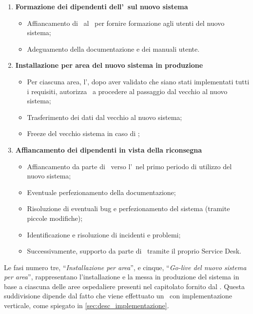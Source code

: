 \begin{enumerate}
		\item \textbf{Formazione dei dipendenti dell'\istituto~sul nuovo sistema}
			\begin{itemize}[noitemsep]
				\renewcommand\labelitemi{--}
				\item Affiancamento di \azienda~al \proponente~per fornire formazione agli utenti del nuovo sistema;
				\item Adeguamento della documentazione e dei manuali utente.
			\end{itemize}
		
		\item \textbf{Installazione per area del nuovo sistema in produzione}
			\begin{itemize}[noitemsep]
				\renewcommand\labelitemi{--}
				\item Per ciascuna area, l'\istituto, dopo aver validato che siano stati implementati tutti i requisiti, autorizza \azienda~a procedere al passaggio dal vecchio al nuovo sistema;
				\item Trasferimento dei dati dal vecchio al nuovo sistema;
				\item Freeze del vecchio sistema in caso di \rollback;
			\end{itemize}
		
		\item \textbf{Affiancamento dei dipendenti in vista della riconsegna}
			\begin{itemize}[noitemsep]
				\renewcommand\labelitemi{--}
				\item Affiancamento da parte di \azienda~verso l'\istituto~nel primo periodo di utilizzo del nuovo sistema;
				\item Eventuale perfezionamento della documentazione;
				\item Risoluzione di eventuali bug e perfezionamento del sistema (tramite piccole modifiche);
				\item Identificazione e risoluzione di incidenti e problemi;
				\item Successivamente, supporto da parte di \azienda~tramite il proprio Service Desk.
			\end{itemize}
		
	\end{enumerate}

	Le fasi numero tre, ``\textit{Installazione per area}'', e cinque, ``\textit{Go-live del nuovo sistema per area}'', rappresentano l'installazione e la messa in produzione del sistema in base a ciascuna delle aree ospedaliere presenti nel capitolato fornito dal \proponente.
	Questa suddivisione dipende dal fatto che viene effettuato un \rollout~con implementazione verticale, come spiegato in \ref{sec:desc_implementazione}.
	
